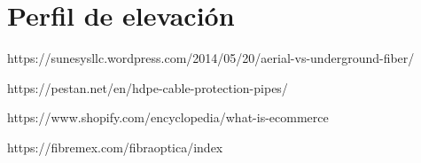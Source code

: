 \documentclass[12pt,letterpaper]{article}
\begin{document}
\section{Perfil de elevación }

\begin{thebibliography}{20}
    https://sunesysllc.wordpress.com/2014/05/20/aerial-vs-underground-fiber/

    https://pestan.net/en/hdpe-cable-protection-pipes/
    

    https://www.shopify.com/encyclopedia/what-is-ecommerce

    https://fibremex.com/fibraoptica/index
\end{thebibliography}
\end{document}
